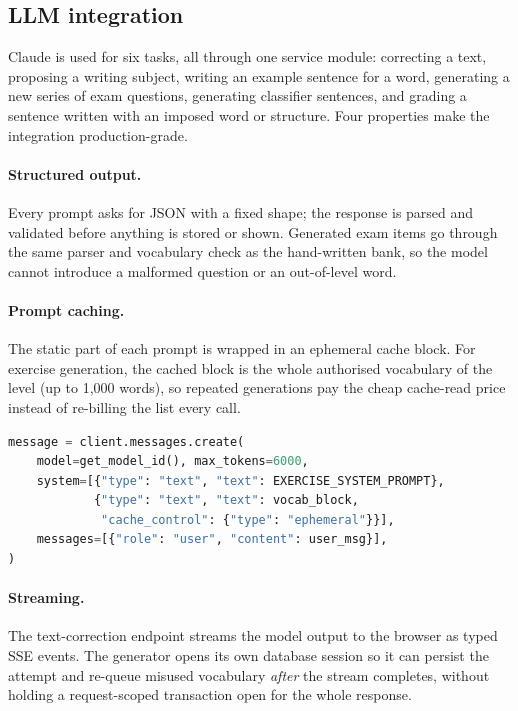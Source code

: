 \documentclass[11pt,a4paper]{article}
\begin{document}
\subsection{LLM integration}

Claude is used for six tasks, all through one service module: correcting a
text, proposing a writing subject, writing an example sentence for a word,
generating a new series of exam questions, generating classifier sentences, and
grading a sentence written with an imposed word or structure. Four properties
make the integration production-grade.

\paragraph{Structured output.} Every prompt asks for JSON with a fixed shape;
the response is parsed and validated before anything is stored or shown.
Generated exam items go through the same parser and vocabulary check as the
hand-written bank, so the model cannot introduce a malformed question or an
out-of-level word.

\paragraph{Prompt caching.} The static part of each prompt is wrapped in an
ephemeral cache block. For exercise generation, the cached block is the whole
authorised vocabulary of the level (up to 1,000 words), so repeated generations
pay the cheap cache-read price instead of re-billing the list every call.

\begin{lstlisting}[language=Python,caption={Prompt caching --- the vocabulary
of the level is cached; only the request varies.}]
message = client.messages.create(
    model=get_model_id(), max_tokens=6000,
    system=[{"type": "text", "text": EXERCISE_SYSTEM_PROMPT},
            {"type": "text", "text": vocab_block,
             "cache_control": {"type": "ephemeral"}}],
    messages=[{"role": "user", "content": user_msg}],
)
\end{lstlisting}

\paragraph{Streaming.} The text-correction endpoint streams the model output to
the browser as typed SSE events. The generator opens its own database session
so it can persist the attempt and re-queue misused vocabulary \emph{after} the
stream completes, without holding a request-scoped transaction open for the
whole response.
\end{document}
